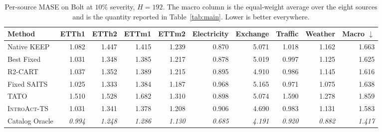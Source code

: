 \documentclass{article}
\newcommand{\oracle}[1]{\textit{\textcolor{phgray}{#1}}}
\newcommand{\introact}{\textsc{IntroAct-TS}}
\begin{document}
\begin{table}[htbp]
  \caption{Per-source MASE on Bolt at $10\%$ severity, $H=192$. The macro column is the
  equal-weight average over the eight sources and is the quantity reported in
  Table~\ref{tab:main}. Lower is better everywhere.}
  \label{tab:app-src-bolt-192}
  \centering
  \small
  \setlength{\tabcolsep}{3pt}
\begin{tabular*}{\textwidth}{@{\extracolsep{\fill}}lrrrrrrrrr@{}}
    \toprule
    Method & ETTh1 & ETTh2 & ETTm1 & ETTm2 & Electricity & Exchange & Traffic & Weather & Macro $\downarrow$ \\
    \midrule
    Native KEEP & 1.082 & 1.447 & 1.415 & 1.239 & 0.870 & 5.071 & 1.018 & 1.162 & 1.663 \\
    Best Fixed & 1.031 & 1.348 & 1.385 & 1.217 & 0.878 & 5.019 & 0.997 & 1.125 & 1.625 \\
    R2-CART & 1.037 & 1.352 & 1.389 & 1.215 & 0.895 & 4.910 & 0.986 & 1.145 & 1.616 \\
    Fixed SAITS & 1.025 & 1.333 & 1.384 & 1.187 & 0.968 & 5.165 & 0.971 & 1.075 & 1.638 \\
    TATO & 1.510 & 1.528 & 1.682 & 1.310 & 0.898 & 5.074 & 1.590 & 1.278 & 1.859 \\
    \midrule
    \rowcolor{bestgray}\introact{} & 1.031 & 1.341 & 1.378 & 1.208 & 0.906 & 4.690 & 0.983 & 1.131 & 1.583 \\
    \midrule
    Catalog Oracle & \oracle{0.994} & \oracle{1.248} & \oracle{1.286} & \oracle{1.130} & \oracle{0.685} & \oracle{4.191} & \oracle{0.920} & \oracle{0.882} & \oracle{1.417} \\
    \bottomrule
  \end{tabular*}
\end{table}
\end{document}
